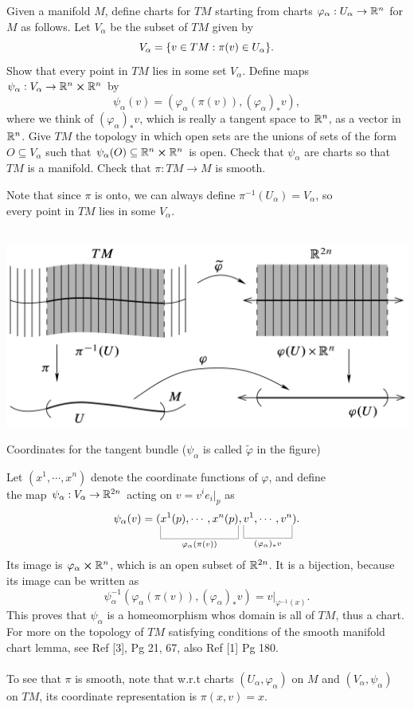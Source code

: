 \documentclass[10pt]{article}
\begin{document}
\begin{example}\label{b2e55}
	Given a manifold $M$, define charts for $TM$ starting from charts $\varphi_\alpha:U_\alpha\to \mathbb{R}^n$ for $M$ as follows. Let $V_\alpha$ be the subset of $TM$ given by
	$$
	V_\alpha = \lbrace v\in TM:\pi(v)\in U_\alpha\rbrace.
	$$
	Show that every point in $TM$ lies in some set $V_\alpha$. Define maps $\psi_\alpha:V_\alpha\to \mathbb{R}^n \cross \mathbb{R}^n$ by
	$$
	\psi_\alpha(v)=(\varphi_\alpha(\pi(v)),(\varphi_\alpha)_*v),
	$$
	where we think of $(\varphi_\alpha)_*v$, which is really a tangent space to $\mathbb{R}^n$, as a vector in $\mathbb{R}^n$. Give $TM$ the topology in which open sets are the unions of sets of the form $O \subseteq V_\alpha$ such that $\psi_\alpha(O) \subseteq \mathbb{R}^n \cross \mathbb{R}^n$ is open. Check that $\psi_\alpha$ are charts so that $TM$ is a manifold. Check that $\pi:TM\to M$ is smooth.
\end{example}
\sol Note that since $\pi$ is onto, we can always define $\pi^{-1}(U_\alpha) = V_\alpha$, so\\ every point in $TM$ lies in some $V_\alpha$.\\\\
\begin{marginfigure}
	\begin{center}
		\vspace*{30px}\hspace*{-65px}\includegraphics[width=1.8\textwidth]{figs/bundle.png}
	\end{center}
	\caption{Coordinates for the tangent bundle ($\psi_\alpha$ is called $\tilde\varphi$ in the figure)}
\end{marginfigure}
Let $(x^1,\cdots,x^n)$ denote the coordinate functions of $\varphi$, and define\\ the map $\psi_\alpha:V_\alpha\to\mathbb{R}^{2n}$ acting on $v=v^ie_i|_p$ as
$$
\psi_\alpha(v) = (\ub{x^1(p),\cdots,x^n(p)}{\varphi_\alpha(\pi(v))},\ub{v^1,\cdots,v^n}{(\varphi_\alpha)_*v}).
$$
Its image is $\varphi_\alpha \cross \mathbb{R}^n$, which is an open subset of $\mathbb{R}^{2n}$. It is a bijection, because its image can be written as
$$
\psi_\alpha^{-1}(\varphi_\alpha(\pi(v)),(\varphi_\alpha)_*v) = v\Big|_{\varphi^{-1}(x)}.
$$
This proves that $\psi_\alpha$ is a homeomorphism whos domain is all of $TM$, thus a chart. For more on the topology of $TM$ satisfying conditions of the smooth manifold chart lemma, see Ref [3], Pg 21, 67, also Ref [1] Pg 180.\\\\
To see that $\pi$ is smooth, note that w.r.t charts $(U_\alpha,\varphi_\alpha)$ on $M$ and $(V_\alpha,\psi_\alpha)$ on $TM$, its coordinate representation is $\pi(x,v) = x$.
\end{document}
